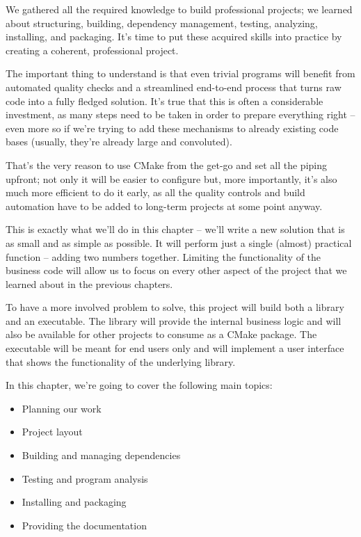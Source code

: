 
We gathered all the required knowledge to build professional projects; we learned about structuring, building, dependency management, testing, analyzing, installing, and packaging. It's time to put these acquired skills into practice by creating a coherent, professional project.

The important thing to understand is that even trivial programs will benefit from automated quality checks and a streamlined end-to-end process that turns raw code into a fully fledged solution. It's true that this is often a considerable investment, as many steps need to be taken in order to prepare everything right – even more so if we're trying to add these mechanisms to already existing code bases (usually, they're already large and convoluted).

That's the very reason to use CMake from the get-go and set all the piping upfront; not only it will be easier to configure but, more importantly, it's also much more efficient to do it early, as all the quality controls and build automation have to be added to long-term projects at some point anyway.

This is exactly what we'll do in this chapter – we'll write a new solution that is as small and as simple as possible. It will perform just a single (almost) practical function – adding two numbers together. Limiting the functionality of the business code will allow us to focus on every other aspect of the project that we learned about in the previous chapters.

To have a more involved problem to solve, this project will build both a library and an executable. The library will provide the internal business logic and will also be available for other projects to consume as a CMake package. The executable will be meant for end users only and will implement a user interface that shows the functionality of the underlying library.

In this chapter, we're going to cover the following main topics:

\begin{itemize}
\item 
Planning our work

\item 
Project layout

\item 
Building and managing dependencies

\item 
Testing and program analysis

\item 
Installing and packaging

\item 
Providing the documentation
\end{itemize}